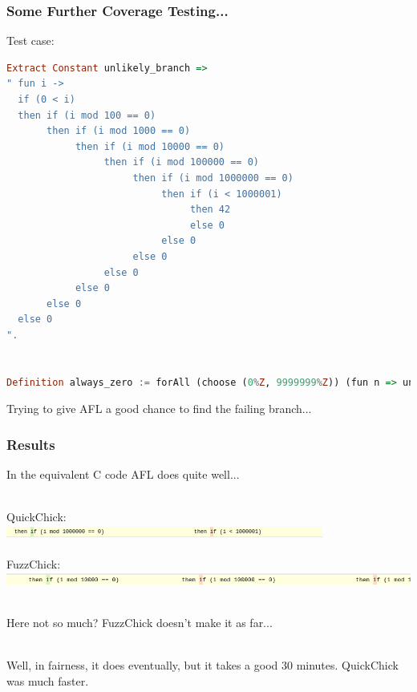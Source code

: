 \documentclass{beamer}
\begin{document}
\begin{frame}[fragile]
  \frametitle{Some Further Coverage Testing...}

  Test case:

\begin{lstlisting}[language=Haskell]
Extract Constant unlikely_branch =>
" fun i ->
  if (0 < i)
  then if (i mod 100 == 0)
       then if (i mod 1000 == 0)
            then if (i mod 10000 == 0)
                 then if (i mod 100000 == 0)
                      then if (i mod 1000000 == 0)
                           then if (i < 1000001)
                                then 42
                                else 0
                           else 0
                      else 0
                 else 0
            else 0
       else 0
  else 0
".


Definition always_zero := forAll (choose (0%Z, 9999999%Z)) (fun n => unlikely_branch n =? 0).
\end{lstlisting}

  \pause

  {\large Trying to give AFL a good chance to find the failing branch...}

\end{frame}

\begin{frame}
  \frametitle{Results}

  In the equivalent C code AFL does quite well... \\~\\

  \pause

  QuickChick: \\

  \includegraphics[width=\textwidth]{qc_branches.png} \\~\\

  FuzzChick: \\

  \includegraphics[width=\textwidth]{fuzz_branches.png} \\~\\

  \pause
  
  Here not so much? FuzzChick doesn't make it as far... \\~\\

  \pause

  Well, in fairness, it does eventually, but it takes a good 30
  minutes. QuickChick was much faster.
  
\end{frame}
\end{document}
